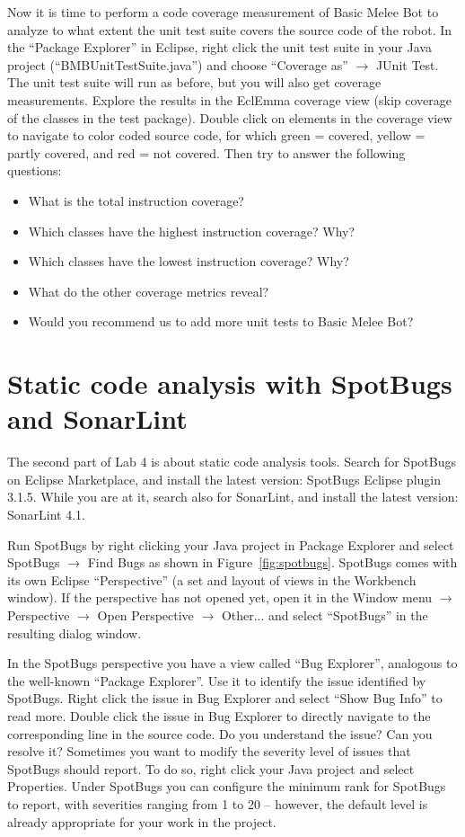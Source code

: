 \documentclass{scrreprt}
\begin{document}
Now it is time to perform a code coverage measurement of Basic Melee Bot to analyze to what extent the unit test suite covers the source code of the robot. In the ``Package Explorer'' in Eclipse, right click the unit test suite in your Java project (``BMBUnitTestSuite.java'') and choose ``Coverage as'' $\rightarrow$ JUnit Test. The unit test suite will run as before, but you will also get coverage measurements. Explore the results in the EclEmma coverage view (skip coverage of the classes in the test package). Double click on elements in the coverage view to navigate to color coded source code, for which green = covered, yellow = partly covered, and red = not covered. Then try to answer the following questions:
\begin{itemize}
\item What is the total instruction coverage?
\item Which classes have the highest instruction coverage? Why?
\item Which classes have the lowest instruction coverage? Why?
\item What do the other coverage metrics reveal?   
\item Would you recommend us to add more unit tests to Basic Melee Bot?
\end{itemize}

\section{Static code analysis with SpotBugs and SonarLint}
The second part of Lab 4 is about static code analysis tools. Search for SpotBugs on Eclipse Marketplace, and install the latest version: SpotBugs Eclipse plugin 3.1.5. While you are at it, search also for SonarLint, and install the latest version: SonarLint 4.1.

Run SpotBugs by right clicking your Java project in Package Explorer and select SpotBugs $\rightarrow$ Find Bugs as shown in Figure~\ref{fig:spotbugs}. SpotBugs comes with its own Eclipse ``Perspective'' (a set and layout of views in the Workbench window). If the perspective has not opened yet, open it in the Window menu $\rightarrow$ Perspective $\rightarrow$ Open Perspective $\rightarrow$ Other... and select ``SpotBugs'' in the resulting dialog window.

In the SpotBugs perspective you have a view called ``Bug Explorer'', analogous to the well-known ``Package Explorer''. Use it to identify the issue identified by SpotBugs. Right click the issue in Bug Explorer and select ``Show Bug Info'' to read more. Double click the issue in Bug Explorer to directly navigate to the corresponding line in the source code. Do you understand the issue? Can you resolve it? Sometimes you want to modify the severity level of issues that SpotBugs should report. To do so, right click your Java project and select Properties. Under SpotBugs you can configure the minimum rank for SpotBugs to report, with severities ranging from 1 to 20 -- however, the default level is already appropriate for your work in the project.
\end{document}
